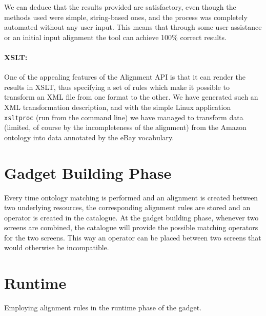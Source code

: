 We can deduce that the results provided are satisfactory, even though the methods used were simple, string-based ones, and the process was completely automated without any user input.
This means that through some user assistance or an initial input alignment the tool can achieve 100\% correct results.

\paragraph{XSLT:}
One of the appealing features of the Alignment API is that it can render the results in XSLT, thus specifying a set of rules which make it possible to transform an  XML file from one format to the other. We have generated such an XML transformation description, and with the simple Linux application \texttt{xsltproc} (run from the command line) we have managed to transform data (limited, of course by the incompleteness of the alignment) from the Amazon ontology into data annotated by the eBay vocabulary. 

\section{Gadget Building Phase}
Every time ontology matching is performed and an alignment is created between two underlying resources, the corresponding alignment rules are stored and an operator is created in the catalogue. At the gadget building phase, whenever two screens are combined, the catalogue will provide the possible matching operators for the two screens. This way an operator can be placed between two screens that would otherwise be incompatible.

\section{Runtime} 
Employing alignment rules in the runtime phase of the gadget.